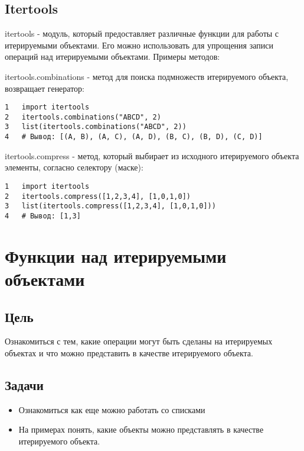 \documentclass[12pt, a4paper]{article}
\begin{document}
\subsection{Itertools}

itertools - модуль, который предоставляет различные функции 
для работы с итерируемыми объектами. Его можно использовать
для упрощения записи операций над итерируемыми объектами.
Примеры методов:

\vspace{1em}

itertools.combinations - метод для поиска подмножеств
итерируемого объекта, возвращает генератор: 
\begin{verbatim}
1   import itertools    
2   itertools.combinations("ABCD", 2)
3   list(itertools.combinations("ABCD", 2))
4   # Вывод: [(A, B), (A, C), (A, D), (B, C), (B, D), (C, D)]
\end{verbatim}

\vspace{1em}

itertools.compress - метод, который выбирает из исходного
итерируемого объекта элементы, согласно селектору (маске):
\begin{verbatim}
1   import itertools    
2   itertools.compress([1,2,3,4], [1,0,1,0])
3   list(itertools.compress([1,2,3,4], [1,0,1,0]))
4   # Вывод: [1,3]
\end{verbatim}
    
\vspace{1em}

\section{Функции над итерируемыми объектами}

\subsection{Цель}

Ознакомиться с тем, какие операции могут быть сделаны
на итерируемых объектах и что можно представить в качестве
итерируемого объекта.

\subsection{Задачи}

\begin{itemize}
    \item Ознакомиться как еще можно работать со списками
    \item На примерах понять, какие объекты можно представлять
    в качестве итерируемого объекта.
\end{itemize}
\end{document}
